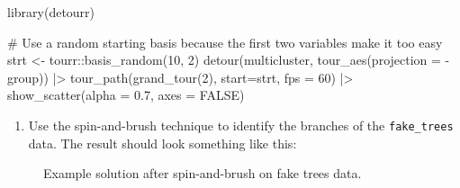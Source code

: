 \documentclass[
  letterpaper,
]{krantz}
\newenvironment{Shaded}{\begin{snugshade}}{\end{snugshade}}
\newcommand{\AttributeTok}[1]{\textcolor[rgb]{0.40,0.45,0.13}{#1}}
\newcommand{\CommentTok}[1]{\textcolor[rgb]{0.37,0.37,0.37}{#1}}
\newcommand{\ConstantTok}[1]{\textcolor[rgb]{0.56,0.35,0.01}{#1}}
\newcommand{\DecValTok}[1]{\textcolor[rgb]{0.68,0.00,0.00}{#1}}
\newcommand{\FloatTok}[1]{\textcolor[rgb]{0.68,0.00,0.00}{#1}}
\newcommand{\FunctionTok}[1]{\textcolor[rgb]{0.28,0.35,0.67}{#1}}
\newcommand{\NormalTok}[1]{\textcolor[rgb]{0.00,0.23,0.31}{#1}}
\newcommand{\OtherTok}[1]{\textcolor[rgb]{0.00,0.23,0.31}{#1}}
\newcommand{\SpecialCharTok}[1]{\textcolor[rgb]{0.37,0.37,0.37}{#1}}
\providecommand{\tightlist}{%
  \setlength{\itemsep}{0pt}\setlength{\parskip}{0pt}}\usepackage{longtable,booktabs,array}
\begin{document}
\begin{Shaded}
\begin{Highlighting}[]
\FunctionTok{library}\NormalTok{(detourr)}

\CommentTok{\# Use a random starting basis because the first two variables make it too easy}
\NormalTok{strt }\OtherTok{\textless{}{-}}\NormalTok{ tourr}\SpecialCharTok{::}\FunctionTok{basis\_random}\NormalTok{(}\DecValTok{10}\NormalTok{, }\DecValTok{2}\NormalTok{)}
\FunctionTok{detour}\NormalTok{(multicluster, }
       \FunctionTok{tour\_aes}\NormalTok{(}\AttributeTok{projection =} \SpecialCharTok{{-}}\NormalTok{group)) }\SpecialCharTok{|\textgreater{}}
       \FunctionTok{tour\_path}\NormalTok{(}\FunctionTok{grand\_tour}\NormalTok{(}\DecValTok{2}\NormalTok{), }\AttributeTok{start=}\NormalTok{strt, }\AttributeTok{fps =} \DecValTok{60}\NormalTok{) }\SpecialCharTok{|\textgreater{}}
       \FunctionTok{show\_scatter}\NormalTok{(}\AttributeTok{alpha =} \FloatTok{0.7}\NormalTok{, }\AttributeTok{axes =} \ConstantTok{FALSE}\NormalTok{)}
\end{Highlighting}
\end{Shaded}

\begin{enumerate}
\def\labelenumi{\arabic{enumi}.}
\setcounter{enumi}{2}
\tightlist
\item
  Use the spin-and-brush technique to identify the branches of the
  \texttt{fake\_trees} data. The result should look something like this:
\end{enumerate}

\begin{figure}


\caption{\label{fig-fake-trees-sb}Example solution after spin-and-brush
on fake trees data.}

\end{figure}%
\end{document}
